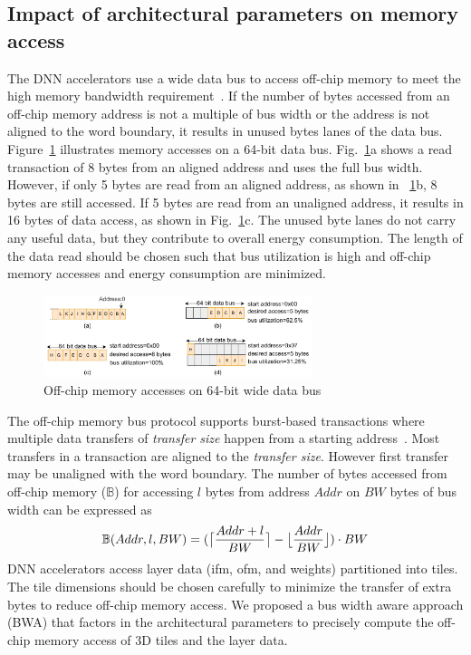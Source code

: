 \documentclass[a4paper,10pt]{article}
\DeclarePairedDelimiter{\ceil}{\lceil}{\rceil}
\DeclarePairedDelimiter\floor{\lfloor}{\rfloor}
\newcommand{\numBytesOffChip}{\mathbb{B}}
\newcommand{\busWidth}{BW}
\newcommand{\dataLength}{l}
\newcommand{\addressSym}{Addr}
\begin{document}
\subsection{Impact of architectural parameters on memory access}\label{sec:OffChipAccessModel}
The DNN accelerators use a wide data bus to access off-chip memory to meet the high memory bandwidth requirement~\cite{Chen2016EyerissAS,chen2014diannao}. If the number of bytes accessed from an off-chip memory address is not a multiple of bus width or the address is not aligned to the word boundary, it results in unused bytes lanes of the data bus. Figure~\ref{fig:AXI_AccesseOn64BitDataBus} illustrates memory accesses on a 64-bit data bus.  Fig.~\ref{fig:AXI_AccesseOn64BitDataBus}a shows a read transaction of 8 bytes from an aligned address and uses the full bus width. However, if only 5 bytes are read from an aligned address, as shown in \figurename~\ref{fig:AXI_AccesseOn64BitDataBus}b, 8 bytes are still accessed. If 5 bytes are read from an unaligned address, it results in 16 bytes of data access, as shown in Fig.~\ref{fig:AXI_AccesseOn64BitDataBus}c. The unused byte lanes do not carry any useful data, but they contribute to overall energy consumption. The length of the data read should be chosen such that bus utilization is high and off-chip memory accesses and energy consumption are minimized.
\begin{figure}[!htb]
	\centering
	\captionsetup{font=sf}	
	\includegraphics[width=0.7\textwidth]{./images/BurstTranscationOnAXI}
	\caption{Off-chip memory accesses on 64-bit wide data bus}
	\label{fig:AXI_AccesseOn64BitDataBus}
\end{figure}
The off-chip memory bus protocol supports burst-based transactions where multiple data transfers of \emph{transfer size} happen from a starting address~\cite{AxiProtocolSpec}. Most transfers in a transaction are aligned to the \emph{transfer size}. However first transfer may be unaligned with the word boundary. 
The number of bytes accessed from off-chip memory ($\numBytesOffChip$) for accessing $\dataLength$ bytes from address $\addressSym$ on $\busWidth$ bytes of bus width can be expressed as
\begin{equation}\label{eq:accessfromUnalignedAddr}
	\begin{aligned}
		\numBytesOffChip(\addressSym,\dataLength,\busWidth)=(\ceil[\big]{\frac{\addressSym+\dataLength}{\busWidth}}-\floor[\big]{\frac{\addressSym}{\busWidth}})\cdot{\busWidth}
	\end{aligned}
\end{equation}
DNN accelerators access layer data (ifm, ofm, and weights) partitioned into tiles. The tile dimensions should be chosen carefully to minimize the transfer of extra bytes to reduce off-chip memory access. We proposed a bus width aware approach (BWA) that factors in the architectural parameters to precisely compute the off-chip memory access of 3D tiles and the layer data.
\end{document}
